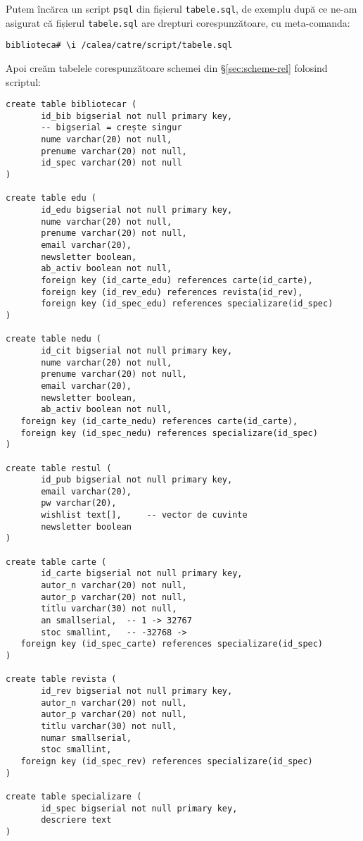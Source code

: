 Putem încărca un script \texttt{psql} din fișierul \texttt{tabele.sql}, de
exemplu după ce ne-am asigurat că fișierul \texttt{tabele.sql} are
drepturi corespunzătoare, cu meta-comanda:

\begin{verbatim}
biblioteca# \i /calea/catre/script/tabele.sql
\end{verbatim}

Apoi creăm tabelele corespunzătoare schemei din \S\ref{sec:scheme-rel}
folosind scriptul:

\begin{verbatim}
create table bibliotecar (
	   id_bib bigserial not null primary key,
	   -- bigserial = crește singur
	   nume varchar(20) not null,
	   prenume varchar(20) not null,
	   id_spec varchar(20) not null
)

create table edu (
	   id_edu bigserial not null primary key,
	   nume varchar(20) not null,
	   prenume varchar(20) not null,
	   email varchar(20),
	   newsletter boolean,
	   ab_activ boolean not null,
	   foreign key (id_carte_edu) references carte(id_carte),
	   foreign key (id_rev_edu) references revista(id_rev),
	   foreign key (id_spec_edu) references specializare(id_spec)
)

create table nedu (
	   id_cit bigserial not null primary key,
	   nume varchar(20) not null,
	   prenume varchar(20) not null,
	   email varchar(20),
	   newsletter boolean,
	   ab_activ boolean not null,
   foreign key (id_carte_nedu) references carte(id_carte),
   foreign key (id_spec_nedu) references specializare(id_spec)
)

create table restul (
	   id_pub bigserial not null primary key,
	   email varchar(20),
	   pw varchar(20),
	   wishlist text[],		-- vector de cuvinte
	   newsletter boolean
)

create table carte (
	   id_carte bigserial not null primary key,
	   autor_n varchar(20) not null,
	   autor_p varchar(20) not null,
	   titlu varchar(30) not null,
	   an smallserial,	-- 1 -> 32767
	   stoc smallint,	-- -32768 -> 
   foreign key (id_spec_carte) references specializare(id_spec)
)

create table revista (
	   id_rev bigserial not null primary key,
	   autor_n varchar(20) not null,
	   autor_p varchar(20) not null,
	   titlu varchar(30) not null,
	   numar smallserial,
	   stoc smallint,
   foreign key (id_spec_rev) references specializare(id_spec)
)

create table specializare (
	   id_spec bigserial not null primary key,
	   descriere text
)


\end{verbatim}

